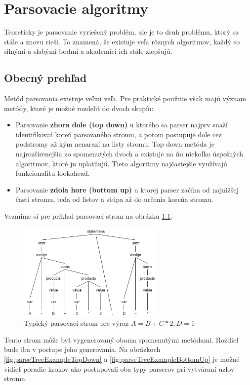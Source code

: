 \chapter{Parsovacie algoritmy}
Teoreticky je parsovanie vyriešený problém, ale je to druh problému, ktorý sa stále a znovu rieši. To znamená, že existuje veľa rôznych algoritmov, každý so silnými a slabými bodmi a akademici ich stále zlepšujú.\cite{tomassetti:parsing}

\section{Obecný prehľad}\label{parsing-alg-basics}
Metód parsovania existuje veľmi veľa. Pre praktické použitie však majú význam metódy, ktoré je možné rozdeliť do dvoch skupín:\cite{CVUT:program_language}
\begin{itemize}
\item Parsovanie \textbf{zhora dole (top down)} u ktorého sa parser najprv snaží identifikovať koreň parsovaného stromu, a potom postupuje dole cez podstromy až kým nenarazí na listy stromu. Top down metóda je najrozšírenejšia zo spomenutých dvoch a existuje na ňu niekoľko úspešných algoritmov, ktoré ju uplatňujú. Tieto algoritmy najčastejšie využívajú funkcionalitu lookahead.
\item Parsovanie \textbf{zdola hore (bottom up)} u ktorej parser začína od najnižšej časti stromu, teda od listov a stúpa až do určenia koreňa stromu. 
\end{itemize}

Vezmime si pre príklad parsovací strom na obrázku \ref{fig:parseTreeExample}. 
\begin{figure}[H]
\begin{center}
\includegraphics[width=7cm]{figures/parseTreeExample.png}
\caption{Typický parsovací strom pre výraz $A = B + C*2;  D = 1$}
\label{fig:parseTreeExample}
\end{center}
\end{figure}

Tento strom môže byť vygenerovaný oboma spomenutými metódami. Rozdiel bude iba v postupe jeho generovania. Na obrázkoch \ref{fig:parseTreeExampleTopDown} a \ref{fig:parseTreeExampleBottomUp} je možné vidieť poradie krokov ako postupovali oba typy parserov pri vytváraní uzlov stromu.

